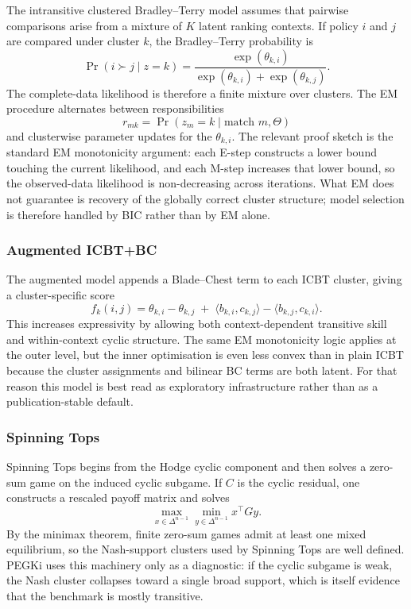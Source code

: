 \documentclass[twoside,twocolumn,9pt]{article}
\begin{document}
The intransitive clustered Bradley--Terry model assumes that pairwise comparisons arise from a mixture of $K$ latent ranking contexts. If policy $i$ and $j$ are compared under cluster $k$, the Bradley--Terry probability is
\[
\Pr(i\succ j\mid z=k)=
\frac{\exp(\theta_{k,i})}{\exp(\theta_{k,i})+\exp(\theta_{k,j})}.
\]
The complete-data likelihood is therefore a finite mixture over clusters. The EM procedure alternates between responsibilities
\[
r_{mk}=\Pr(z_m=k\mid \text{match }m,\Theta)
\]
and clusterwise parameter updates for the $\theta_{k,i}$. The relevant proof sketch is the standard EM monotonicity argument: each E-step constructs a lower bound touching the current likelihood, and each M-step increases that lower bound, so the observed-data likelihood is non-decreasing across iterations. What EM does not guarantee is recovery of the globally correct cluster structure; model selection is therefore handled by BIC rather than by EM alone.

\subsubsection{Augmented ICBT+BC}

The augmented model appends a Blade--Chest term to each ICBT cluster, giving a cluster-specific score
\[
f_k(i,j)=
\theta_{k,i}-\theta_{k,j}
\;+\;
\langle b_{k,i},c_{k,j}\rangle-\langle b_{k,j},c_{k,i}\rangle.
\]
This increases expressivity by allowing both context-dependent transitive skill and within-context cyclic structure. The same EM monotonicity logic applies at the outer level, but the inner optimisation is even less convex than in plain ICBT because the cluster assignments and bilinear BC terms are both latent. For that reason this model is best read as exploratory infrastructure rather than as a publication-stable default.

\subsubsection{Spinning Tops}

Spinning Tops begins from the Hodge cyclic component and then solves a zero-sum game on the induced cyclic subgame. If $C$ is the cyclic residual, one constructs a rescaled payoff matrix and solves
\[
\max_{x\in\Delta^{n-1}} \min_{y\in\Delta^{n-1}} x^\top G y.
\]
By the minimax theorem, finite zero-sum games admit at least one mixed equilibrium, so the Nash-support clusters used by Spinning Tops are well defined. PEGKi uses this machinery only as a diagnostic: if the cyclic subgame is weak, the Nash cluster collapses toward a single broad support, which is itself evidence that the benchmark is mostly transitive.
\end{document}
